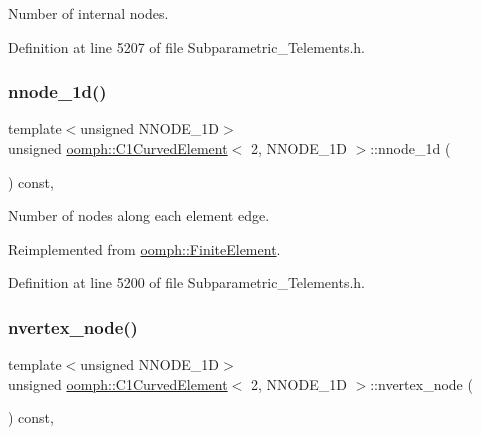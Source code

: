 Number of internal nodes. 



Definition at line 5207 of file Subparametric\+\_\+\+Telements.\+h.

\mbox{\label{classoomph_1_1C1CurvedElement_3_012_00_01NNODE__1D_01_4_a3e7e8460e53e261ff68ac58ea57dfc87}} 
\subsubsection{\texorpdfstring{nnode\+\_\+1d()}{nnode\_1d()}}
{\footnotesize\ttfamily template$<$unsigned N\+N\+O\+D\+E\+\_\+1D$>$ \\
unsigned \hyperlink{classoomph_1_1C1CurvedElement}{oomph\+::\+C1\+Curved\+Element}$<$ 2, N\+N\+O\+D\+E\+\_\+1D $>$\+::nnode\+\_\+1d (\begin{DoxyParamCaption}{ }\end{DoxyParamCaption}) const\hspace{0.3cm}{\ttfamily [inline]}, {\ttfamily [virtual]}}



Number of nodes along each element edge. 



Reimplemented from \hyperlink{classoomph_1_1FiniteElement_ab65c7a94dda80c1876a09ac12be4e39c}{oomph\+::\+Finite\+Element}.



Definition at line 5200 of file Subparametric\+\_\+\+Telements.\+h.

\mbox{\label{classoomph_1_1C1CurvedElement_3_012_00_01NNODE__1D_01_4_abc52b97fb811db2bdb58661442dbffdf}} 
\subsubsection{\texorpdfstring{nvertex\+\_\+node()}{nvertex\_node()}}
{\footnotesize\ttfamily template$<$unsigned N\+N\+O\+D\+E\+\_\+1D$>$ \\
unsigned \hyperlink{classoomph_1_1C1CurvedElement}{oomph\+::\+C1\+Curved\+Element}$<$ 2, N\+N\+O\+D\+E\+\_\+1D $>$\+::nvertex\+\_\+node (\begin{DoxyParamCaption}{ }\end{DoxyParamCaption}) const\hspace{0.3cm}{\ttfamily [inline]}, {\ttfamily [virtual]}}




